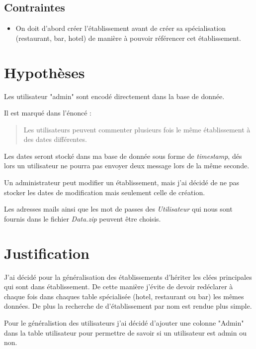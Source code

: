 \documentclass[a4paper,10pt]{article}
\begin{document}
\subsection{Contraintes}

\begin{itemize}
    \item On doit d'abord créer l'établissement avant de créer sa
        spécialisation (restaurant, bar, hotel) de manière à pouvoir
        référencer cet établissement.
\end{itemize}

\section{Hypothèses}
Les utilisateur "admin" sont encodé directement dans la base de donnée.
\newline

Il est marqué dans l'énoncé :
\begin{quote}
    Les utilisateurs peuvent commenter plusieurs fois le même
    établissement à des dates différentes.
\end{quote}
Les dates seront stocké dans ma base de donnée sous forme de \emph{timestamp},
dés lors un utilisateur ne pourra pas envoyer deux message lors de la même seconde.
\newline

Un administrateur peut modifier un établissement, mais j'ai décidé de ne pas
stocker les dates de modification mais seulement celle de création.
\newline

Les adresses mails ainsi que les mot de passes des \emph{Utilisateur} qui nous
sont fournis dans le fichier \emph{Data.zip} peuvent être choisis.

\section{Justification}

J'ai décidé pour la généralisation des établissements d'hériter les clées
principales qui sont dans établissement. De cette manière j'évite de devoir
redéclarer à chaque fois dans chaques table spécialisée (hotel, restaurant ou
bar) les mêmes données. De plus la recherche de d'établissement par nom est
rendue plus simple. \newline

Pour le généralistion des utilisateurs j'ai décidé d'ajouter une colonne
"Admin" dans la table utilisateur pour permettre de savoir si un utilisateur
est admin ou non. \newline
\end{document}
